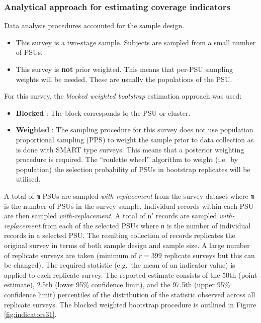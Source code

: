 \documentclass[12pt,a4paper]{article}
\begin{document}
\hypertarget{analytical-approach-for-estimating-coverage-indicators}{%
\subsubsection{Analytical approach for estimating coverage indicators}\label{analytical-approach-for-estimating-coverage-indicators}}

Data analysis procedures accounted for the sample design.

\begin{itemize}
\item
  This survey is a two-stage sample. Subjects are sampled from a small number of PSUs.
\item
  This survey is \textbf{not} prior weighted. This means that per-PSU sampling weights will be needed. These are usually the populations of the PSU.
\end{itemize}

For this survey, the \emph{blocked weighted bootstrap} estimation approach was used:

\begin{itemize}
\item
  \textbf{Blocked} : The block corresponds to the PSU or cluster.
\item
  \textbf{Weighted} : The sampling procedure for this survey does not use population proportional sampling (PPS) to weight the sample prior to data collection as is done with SMART type surveys. This means that a posterior weighting procedure is required. The ``roulette wheel'' algorithm to weight (i.e.~by population) the selection probability of PSUs in bootstrap replicates will be utilised.
\end{itemize}

A total of \texttt{m} PSUs are sampled \emph{with-replacement} from the survey dataset where \texttt{m} is the number of PSUs in the survey sample. Individual records within each PSU are then sampled \emph{with-replacement}. A total of n' records are sampled \emph{with-replacement} from each of the selected PSUs where \texttt{n} is the number of individual records in a selected PSU. The resulting collection of records replicates the original survey in terms of both sample design and sample size. A large number of replicate surveys are taken (minimum of \(r = 399\) replicate surveys but this can be changed). The required statistic (e.g.~the mean of an indicator value) is applied to each replicate survey. The reported estimate consists of the 50th (point estimate), 2.5th (lower 95\% confidence limit), and the 97.5th (upper 95\% confidence limit) percentiles of the distribution of the statistic observed across all replicate surveys. The blocked weighted bootstrap procedure is outlined in Figure \ref{fig:indicators31}.
\end{document}

